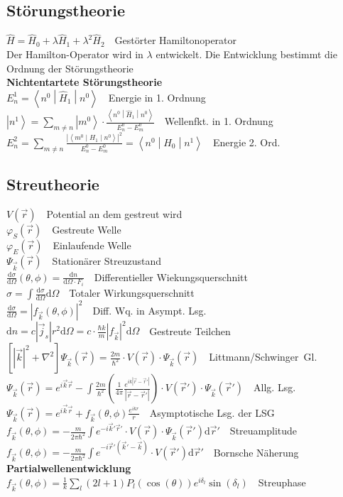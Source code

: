 \documentclass[8pt,a4paper]{extarticle}
\newcommand{\frml}[2]{$#1$~\hfill~#2\\}
\newcommand{\tder}[2]{\frac{\mathrm d #1}{\mathrm d #2}}
\newcommand{\ket}[1]{\left|#1\right\rangle}
\newcommand{\oper}[1]{\hat#1}
\newcommand{\bratenket}[3]                            %
{\left\langle#1 \middle| #2 \middle|  %
#3\right\rangle}
\begin{document}
\begin{multicols}{3}
\subsection{St\"orungstheorie}
\frml{\oper{H} = \oper{H}_0 + \lambda\oper{H}_1 + \lambda^2\oper{H}_2}{Gest\"orter Hamiltonoperator}
Der Hamilton-Operator wird in $\lambda$ entwickelt. Die Entwicklung bestimmt die Ordnung der St\"orungstheorie\\
\textbf{Nichtentartete St\"orungstheorie}\\
\frml{E_n^1 = \bratenket{n^0}{\oper{H}_1}{n^0}}{Energie in 1. Ordnung}
\frml{\ket{n^1} = \sum_{m\neq n} \ket{m^0}\cdot\frac{\bratenket{n^0}{\oper{H}_1}{n^0}}{E_n^0-E_m^0}}{Wellenfkt. in 1. Ordnung}
\frml{E_n^2 = \sum_{m \neq n} \frac{\left|\bratenket{m^0}{H_1}{n^0}\right|^2}{E_n^0 - E_m^0} = \bratenket{n^0}{H_0}{n^1}}{Energie 2. Ord.}
\subsection{Streutheorie}
\frml{V(\vec{r})}{Potential an dem gestreut wird}
\frml{\varphi_{S}(\vec{r})}{Gestreute Welle}
\frml{\varphi_{E}(\vec{r})}{Einlaufende Welle}
\frml{\Psi_{\vec{k}}(\vec{r})}{Station\"arer Streuzustand}
\frml{\tder{\sigma}{\Omega}(\theta , \phi) = \tder{n}{\Omega \cdot F_i}}{Differentieller Wiekungsquerschnitt}
\frml{\sigma = \int \tder{\sigma}{\Omega} \mathrm{d}\Omega}{Totaler Wirkungsquerschnitt}
\frml{\tder{\sigma}{\Omega} = \left|f_{\vec{k}}(\theta, \phi)\right|^2}{Diff. Wq. in Asympt. Lsg.}
\frml{\mathrm{d}n = c\left|\vec{j}_s\right|r^2\mathrm{d}\Omega = c\cdot \frac{\hbar k}{m}\left|f_{\vec{k}}\right|^2\mathrm{d}\Omega}{Gestreute Teilchen}
\frml{\left[ \left| \vec{k} \right|^2 + \nabla^2\right] \Psi_{\vec{k}}(\vec{r}) = \frac{2m}{\hbar^2}\cdot V(\vec{r}) \cdot \Psi_{\vec{k}}(\vec{r})}{Littmann/Schwinger~Gl.}
\frml{\Psi_{\vec{k}}(\vec{r}) = e^{i\vec{k}\vec{r}}-\int \frac{2m}{\hbar^2}\left(\frac{1}{4\pi}\frac{e^{ik\left|\vec{r}-\vec{r}'\right|}}{\left|\vec{r}-\vec{r}'\right|}\right)\cdot V(\vec{r}')\cdot\Psi_{\vec{k}}(\vec{r}')}{Allg. Lsg.}
\frml{\Psi_{\vec{k}}(\vec{r}) = e^{i\vec{k}\vec{r}} + f_{\vec{k}}(\theta, \phi)\frac{e^{ikr}}{r}}{Asymptotische Lsg. der LSG}
\frml{f_{\vec{k}}(\theta, \phi) = -\frac{m}{2\pi\hbar^2}\int e^{-i\vec{k}'\vec{r}'}\cdot V(\vec{r})\cdot \Psi_{\vec{k}}(\vec{r}')\mathrm{d}\vec{r}'}{Streuamplitude}
\frml{f_{\vec{k}}(\theta, \phi) = -\frac{m}{2\pi\hbar^2}\int e^{-i\vec{r}'(\vec{k}'-\vec{k})}\cdot V(\vec{r}')\mathrm{d}\vec{r}'}{Bornsche N\"aherung}
\textbf{Partialwellenentwicklung} \\
\frml{f_{\vec{k}}(\theta, \phi) = \frac{1}{k}\sum_l (2l+1)P_l(\cos(\theta))e^{i\delta_l}\sin(\delta_l)}{Streuphase}

\end{multicols}
\end{document}
